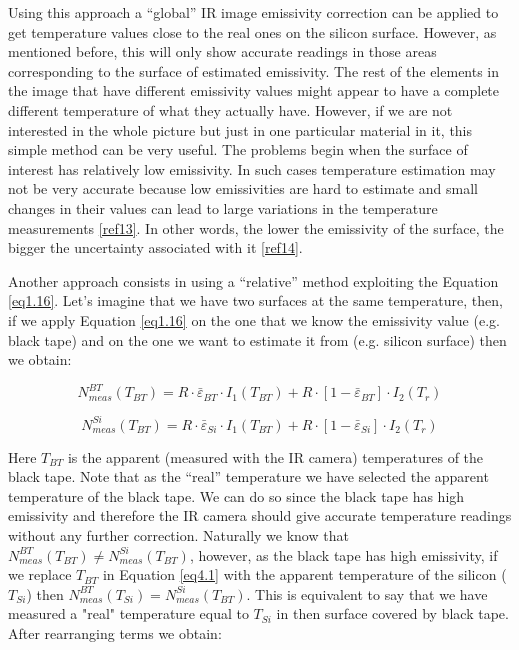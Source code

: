 		Using this approach a “global” IR image emissivity correction can be applied to get temperature values close to the real ones on the silicon surface. However, as mentioned before, this will only show accurate readings in those areas corresponding to the surface of estimated emissivity. The rest of the elements in the image that have different emissivity values might appear to have a complete different temperature of what they actually have. However, if we are not interested in the whole picture but just in one particular material in it, this simple method can be very useful. The problems begin when the surface of interest has relatively low emissivity. In such cases temperature estimation may not be very accurate because low emissivities are hard to estimate and small changes in their values can lead to large variations in the temperature measurements \ref{ref13}. In other words, the lower the emissivity of the surface, the bigger the uncertainty associated with it \ref{ref14}.
		
		Another approach consists in using a “relative” method exploiting the Equation \ref{eq1.16}. Let's imagine that we have two surfaces at the same temperature, then, if we apply Equation \ref{eq1.16} on the one that we know the emissivity value (e.g. black tape) and on the one we want to estimate it from (e.g. silicon surface) then we obtain:
		
		\begin{equation}\label{eq4.1}
		N^{BT}_{meas}(T_{BT})= R \cdot \bar{\varepsilon}_{BT} \cdot I_{1}(T_{BT}) + R \cdot [1- \bar{\varepsilon}_{BT}] \cdot I_{2}(T_{r})
		\end{equation}
		
		\begin{equation}\label{eq4.2}
		N^{Si}_{meas}(T_{BT})= R \cdot \bar{\varepsilon}_{Si} \cdot I_{1}(T_{BT}) + R \cdot [1- \bar{\varepsilon}_{Si}] \cdot I_{2}(T_{r})
		\end{equation}\bigskip
		
		Here $T_{BT}$ is the apparent (measured with the IR camera) temperatures of the black tape. Note that as the “real” temperature we have selected the apparent temperature of the black tape. We can do so since the black tape has high emissivity and therefore the IR camera should give accurate temperature readings without any further correction. Naturally we know that $N^{BT}_{meas}(T_{BT}) \neq N^{Si}_{meas}(T_{BT})$, however, as the black tape has high emissivity, if we replace $T_{BT}$ in Equation \ref{eq4.1} with the apparent temperature of the silicon ($T_{Si}$) then $N^{BT}_{meas}(T_{Si}) = N^{Si}_{meas}(T_{BT})$. This is equivalent to say that we have measured a "real" temperature equal to $T_{Si}$ in then surface covered by black tape. After rearranging terms we obtain:
		
